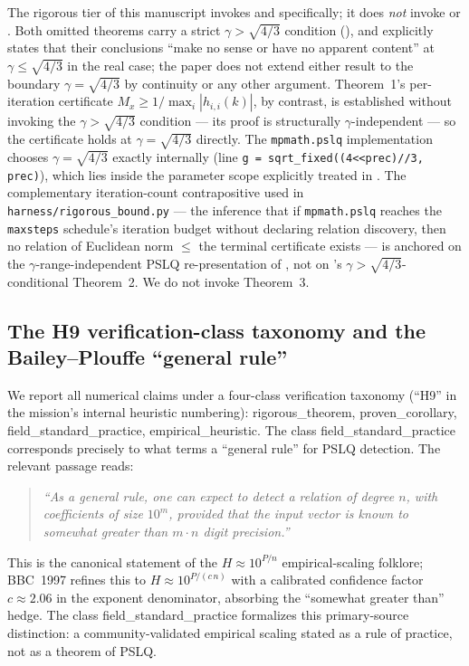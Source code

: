 \documentclass[11pt,a4paper]{article}
\newcommand{\fsp}{\textsf{field\_standard\_practice}}
\newcommand{\pc}{\textsf{proven\_corollary}}
\newcommand{\rt}{\textsf{rigorous\_theorem}}
\newcommand{\eh}{\textsf{empirical\_heuristic}}
\begin{document}
The rigorous tier of this manuscript invokes \cite[Theorem~1]{fba1999} and
\cite[Corollary~2]{fba1999} specifically; it does \emph{not} invoke
\cite[Theorem~2]{fba1999} or \cite[Theorem~3]{fba1999}.
Both omitted theorems carry a strict $\gamma > \sqrt{4/3}$ condition
(\cite[Definition~5]{fba1999}), and \cite[\S 7]{fba1999} explicitly
states that their conclusions ``make no sense or have no apparent
content'' at $\gamma \le \sqrt{4/3}$ in the real case; the paper does
not extend either result to the boundary $\gamma = \sqrt{4/3}$ by
continuity or any other argument.
Theorem~1's per-iteration certificate
$M_{x} \ge 1/\max_{i}|h_{i,i}(k)|$, by contrast, is established
without invoking the $\gamma > \sqrt{4/3}$ condition --- its proof is
structurally $\gamma$-independent --- so the certificate holds at
$\gamma = \sqrt{4/3}$ directly.
The \texttt{mpmath.pslq} implementation chooses $\gamma = \sqrt{4/3}$
exactly internally (line
\texttt{g~=~sqrt\_fixed((4\textless\textless prec)//3, prec)}),
which lies inside the parameter scope explicitly treated in
\cite[\S 2]{bailey1998}.
The complementary iteration-count contrapositive used in
\texttt{harness/rigorous\_bound.py} --- the inference that if
\texttt{mpmath.pslq} reaches the \texttt{maxsteps} schedule's iteration
budget without declaring relation discovery, then no relation of
Euclidean norm $\le$ the terminal certificate exists --- is anchored on
the $\gamma$-range-independent PSLQ re-presentation of
\cite[\S 2]{bailey1998}, not on \cite{fba1999}'s
$\gamma > \sqrt{4/3}$-conditional Theorem~2.
We do not invoke Theorem~3.

\subsection{The H9 verification-class taxonomy and the
   Bailey--Plouffe ``general rule''}\label{sec:h9}

We report all numerical claims under a four-class verification taxonomy
(``H9'' in the mission's internal heuristic numbering): \rt{}, \pc{},
\fsp{}, \eh{}.
The class \fsp{} corresponds precisely to what \cite[\S 2]{bailey1998}
terms a ``general rule'' for PSLQ detection.
The relevant passage reads:
\begin{quote}
\emph{``As a general rule, one can expect to detect a relation of degree
$n$, with coefficients of size $10^{m}$, provided that the input vector
is known to somewhat greater than $m\cdot n$ digit precision.''}
\hfill\cite[\S 2]{bailey1998}
\end{quote}
This is the canonical statement of the
$H \approx 10^{P/n}$
empirical-scaling folklore; BBC~1997 refines this to $H \approx 10^{P/(c\,n)}$
with a calibrated confidence factor $c \approx 2.06$ in the exponent denominator,
absorbing the ``somewhat greater than'' hedge.
The class \fsp{} formalizes this primary-source distinction: a community-validated
empirical scaling stated as a rule of practice, not as a theorem of PSLQ.
\end{document}
